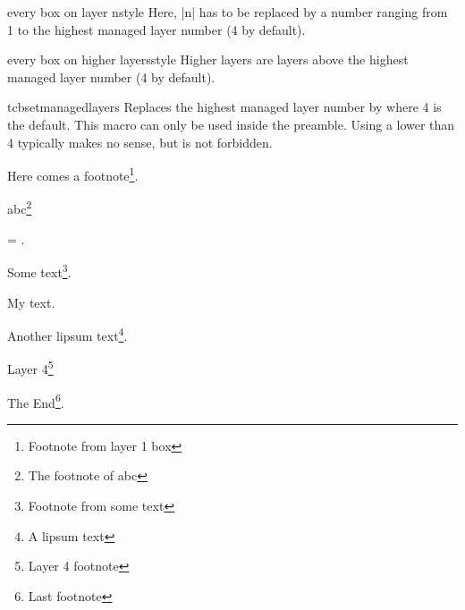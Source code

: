 \clearpage
\begin{docTcbKey}{every box on layer n}{}{style}
Here, |n| has to be replaced by a number ranging from 1 to the highest
managed layer number (4 by default).
\begin{dispListing}
\end{dispListing}
\end{docTcbKey}


\begin{docTcbKey}{every box on higher layers}{}{style}
Higher layers are layers above the highest
managed layer number (4 by default).
\begin{dispListing}
\end{dispListing}
\end{docTcbKey}


\begin{docCommand}{tcbsetmanagedlayers}{}
Replaces the highest managed layer number by  where 4 is
the default. This macro can only be used inside the preamble.
Using a  lower than 4 typically makes no sense, but is
not forbidden.
\end{docCommand}

\begin{tcboutputlisting}
\begin{tcolorbox}[enhanced jigsaw,breakable,title=Layer 1 Box]
Here comes a footnote\footnote{Footnote from layer 1 box}.
\lipsum[2]
  \begin{tcolorbox}[title=Layer 2 Box]
  abc\footnote{The footnote of abc}
  \end{tcolorbox}
  \begin{tcolorbox}[title=Another Box,ams equation]
     = \infty.
  \end{tcolorbox}
Some text\footnote{Footnote from some text}.
  \begin{tcolorbox}[title=Yet Another Box]
    \tcboxfit[height=2cm]{\lipsum[1]}
    My text.
    \begin{tcolorbox}
      Another lipsum text\footnote{A lipsum text}. \lipsum[3]
      \begin{tcolorbox}[title=Layer 4,colframe=blue,colback=white]
        Layer 4\footnote{Layer 4 footnote}
      \end{tcolorbox}
      The End\footnote{Last footnote}.
    \end{tcolorbox}
  \end{tcolorbox}
\end{tcolorbox}
\end{tcboutputlisting}

